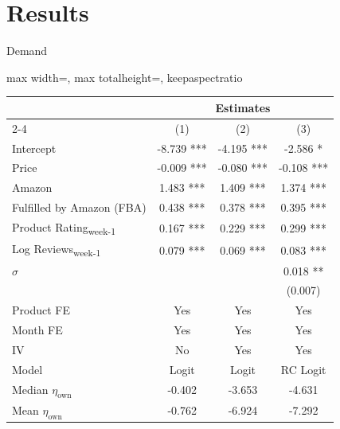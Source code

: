 \documentclass[aspectratio=169,professionalfonts]{beamer}
\begin{document}
\section{Results}

\begin{frame}{Demand}
\centering
\begin{adjustbox}{max width=\linewidth, max totalheight=\textheight, keepaspectratio}
  {\scriptsize
\begin{tabular}{lccc}
\toprule
& \multicolumn{3}{c}{Estimates} \\
\cmidrule(lr){2-4}
& (1) & (2) & (3) \\
\midrule
Intercept                      & -8.739 *** & -4.195 *** & -2.586 *  \\
Price                          & -0.009 *** & -0.080 *** & -0.108 ***\\
Amazon                         & 1.483 ***  & 1.409 ***  & 1.374 *** \\
Fulfilled by Amazon (FBA)      & 0.438 ***  & 0.378 ***  & 0.395 *** \\
Product Rating\textsubscript{week-1}
                               & 0.167 ***  & 0.229 ***  & 0.299 *** \\
Log Reviews\textsubscript{week-1}
                               & 0.079 ***  & 0.069 ***  & 0.083 *** \\
$\sigma$                       &            &            & 0.018 **  \\
                               &            &            & (0.007)   \\
\midrule
Product FE                     & Yes        & Yes        & Yes       \\
Month FE                       & Yes        & Yes        & Yes       \\
IV                             & No         & Yes        & Yes       \\
Model                          & Logit      & Logit      & RC Logit  \\
\midrule
Median $\eta_{\text{own}}$     & -0.402     & -3.653     & -4.631    \\
Mean $\eta_{\text{own}}$       & -0.762     & -6.924     & -7.292    \\
\bottomrule
\end{tabular}
  }
\end{adjustbox}
\end{frame}
\end{document}
